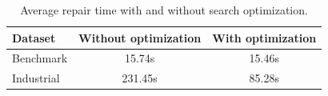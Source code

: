 \begin{table}[t]
\caption{Average repair time with and without search optimization.}
\label{tab:search-optimization-results}
\centering
\scriptsize
\setlength{\tabcolsep}{3pt}
\begin{tabular*}{\linewidth}{@{\extracolsep{\fill}}lcc@{}}
\toprule
Dataset & Without optimization & With optimization \\
\midrule
Benchmark & 15.74s & 15.46s \\
Industrial & 231.45s & 85.28s \\
\bottomrule
\end{tabular*}
\end{table}
